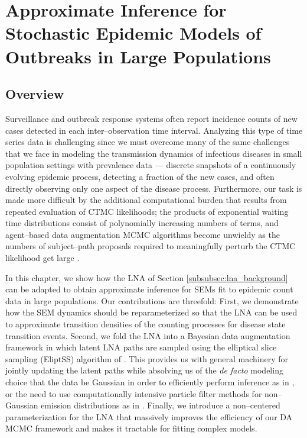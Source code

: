 \chapter{Approximate Inference for Stochastic Epidemic Models of Outbreaks in Large Populations}
\label{chap:lna_for_sems}

\section{Overview}
\label{sec:lna_overview}

Surveillance and outbreak response systems often report incidence counts of new cases detected in each inter--observation time interval. Analyzing this type of time series data is challenging since we must overcome many of the same challenges that we face in modeling the transmission dynamics of infectious diseases in small population settings with prevalence data --- discrete snapshots of a continuously evolving epidemic process, detecting a fraction of the new cases, and often directly observing only one aspect of the disease process. Furthermore, our task is made more difficult by the additional computational burden that results from repeated evaluation of CTMC likelihoods; the products of exponential waiting time distributions consist of polynomially increasing numbers of terms, and agent--based data augmentation MCMC algorithms become unwieldy as the numbers of subject--path proposals required to meaningfully perturb the CTMC likelihood get large \citep{fintzi2017efficient}. 

In this chapter, we show how the LNA of Section \ref{subsubsec:lna_background} can be adapted to obtain approximate inference for SEMs fit to epidemic count data in large populations. Our contributions are threefold: First, we demonstrate how the SEM dynamics should be reparameterized so that the LNA can be used to approximate transition densities of the counting processes for disease state transition events. Second, we fold the LNA into a Bayesian data augmentation framework in which latent LNA paths are sampled using the elliptical slice sampling (EliptSS) algorithm of \cite{murray2010}. This provides us with general machinery for jointly updating the latent paths while absolving us of the \textit{de facto} modeling choice that the data be Gaussian in order to efficiently perform inference as in \cite{fearnhead2014,komorowski2009}, or the need to use computationally intensive particle filter methods for non--Gaussian emission distributions as in \cite{golightly2015delayed}. Finally, we introduce a non--centered parameterization for the LNA that massively improves the efficiency of our DA MCMC framework and makes it tractable for fitting complex models. 

